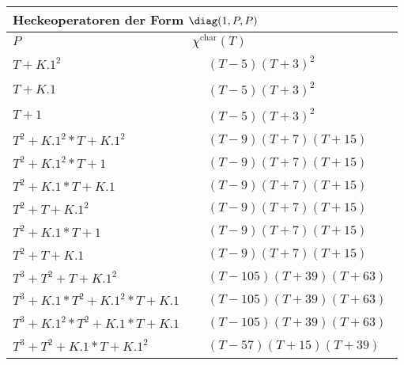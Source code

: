 \begin{tabular}{| l | l |}
\multicolumn{2}{l}{\bf Heckeoperatoren der Form $\diag(1,P,P)$} \\
\hline
$P$ & $\chi^\text{char}(T)$ \\
\hline
$T + K.1^2$ &
$\!\begin{aligned}
	&(T - 5)(T + 3)^{2}\end{aligned}$ \\
\hline
$T + K.1$ &
$\!\begin{aligned}
	&(T - 5)(T + 3)^{2}\end{aligned}$ \\
\hline
$T + 1$ &
$\!\begin{aligned}
	&(T - 5)(T + 3)^{2}\end{aligned}$ \\
\hline
$T^2 + K.1^2*T + K.1^2$ &
$\!\begin{aligned}
	&(T - 9)(T + 7)(T + 15)\end{aligned}$ \\
\hline
$T^2 + K.1^2*T + 1$ &
$\!\begin{aligned}
	&(T - 9)(T + 7)(T + 15)\end{aligned}$ \\
\hline
$T^2 + K.1*T + K.1$ &
$\!\begin{aligned}
	&(T - 9)(T + 7)(T + 15)\end{aligned}$ \\
\hline
$T^2 + T + K.1^2$ &
$\!\begin{aligned}
	&(T - 9)(T + 7)(T + 15)\end{aligned}$ \\
\hline
$T^2 + K.1*T + 1$ &
$\!\begin{aligned}
	&(T - 9)(T + 7)(T + 15)\end{aligned}$ \\
\hline
$T^2 + T + K.1$ &
$\!\begin{aligned}
	&(T - 9)(T + 7)(T + 15)\end{aligned}$ \\
\hline
$T^3 + T^2 + T + K.1^2$ &
$\!\begin{aligned}
	&(T - 105)(T + 39)(T + 63)\end{aligned}$ \\
\hline
$T^3 + K.1*T^2 + K.1^2*T + K.1$ &
$\!\begin{aligned}
	&(T - 105)(T + 39)(T + 63)\end{aligned}$ \\
\hline
$T^3 + K.1^2*T^2 + K.1*T + K.1$ &
$\!\begin{aligned}
	&(T - 105)(T + 39)(T + 63)\end{aligned}$ \\
\hline
$T^3 + T^2 + K.1*T + K.1^2$ &
$\!\begin{aligned}
	&(T - 57)(T + 15)(T + 39)\end{aligned}$ \\
\hline
\end{tabular}


